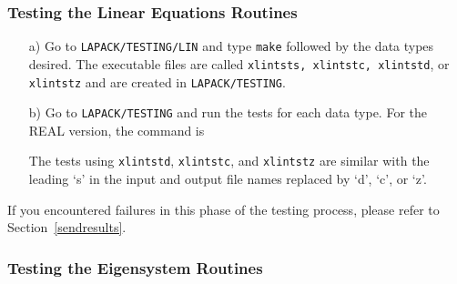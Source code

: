 \subsubsection{Testing the Linear Equations Routines}\label{testlin}

\begin{itemize}

\item[a)]
Go to {\tt LAPACK/TESTING/LIN} and type {\tt make} followed by the data types
desired.  The executable files are called {\tt xlintsts, xlintstc,
xlintstd}, or {\tt xlintstz} and are created in {\tt LAPACK/TESTING}.

\item[b)]
Go to {\tt LAPACK/TESTING} and run the tests for each data type.
For the REAL version, the command is

\noindent
The tests using {\tt xlintstd}, {\tt xlintstc}, and {\tt xlintstz} are similar
with the leading `s' in the input and output file names replaced
by `d', `c', or `z'.

\end{itemize}

If you encountered failures in this phase of the testing process, please
refer to Section~\ref{sendresults}.

\subsubsection{Testing the Eigensystem Routines}\label{testeig}

